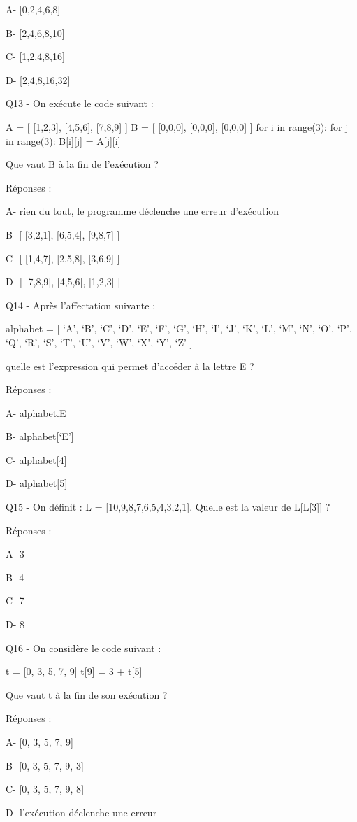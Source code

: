 \documentclass[
]{book}
\begin{document}
A- {[}0,2,4,6,8{]}

B- {[}2,4,6,8,10{]}

C- {[}1,2,4,8,16{]}

D- {[}2,4,8,16,32{]}

Q13 - On exécute le code suivant :

A = {[} {[}1,2,3{]}, {[}4,5,6{]}, {[}7,8,9{]} {]}
B = {[} {[}0,0,0{]}, {[}0,0,0{]}, {[}0,0,0{]} {]}
for i in range(3):
for j in range(3):
B{[}i{]}{[}j{]} = A{[}j{]}{[}i{]}

Que vaut B à la fin de l'exécution ?

Réponses :

A- rien du tout, le programme déclenche une erreur d'exécution

B- {[} {[}3,2,1{]}, {[}6,5,4{]}, {[}9,8,7{]} {]}

C- {[} {[}1,4,7{]}, {[}2,5,8{]}, {[}3,6,9{]} {]}

D- {[} {[}7,8,9{]}, {[}4,5,6{]}, {[}1,2,3{]} {]}

Q14 - Après l'affectation suivante :

alphabet = {[} `A', `B', `C', `D', `E', `F', `G', `H', `I', `J', `K', `L', `M', `N', `O', `P', `Q', `R', `S', `T', `U', `V', `W', `X', `Y', `Z' {]}

quelle est l'expression qui permet d'accéder à la lettre E ?

Réponses :

A- alphabet.E

B- alphabet{[}`E'{]}

C- alphabet{[}4{]}

D- alphabet{[}5{]}

Q15 - On définit : L = {[}10,9,8,7,6,5,4,3,2,1{]}. Quelle est la valeur de L{[}L{[}3{]}{]} ?

Réponses :

A- 3

B- 4

C- 7

D- 8

Q16 - On considère le code suivant :

t = {[}0, 3, 5, 7, 9{]}
t{[}9{]} = 3 + t{[}5{]}

Que vaut t à la fin de son exécution ?

Réponses :

A- {[}0, 3, 5, 7, 9{]}

B- {[}0, 3, 5, 7, 9, 3{]}

C- {[}0, 3, 5, 7, 9, 8{]}

D- l'exécution déclenche une erreur
\end{document}
